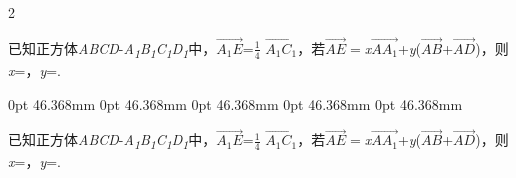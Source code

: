 \documentclass[fontset=none]{ctexart}
\begin{document}
\def\QPTEXT{已知正方体\emph{ABCD}-\emph{A\textsubscript{1}B\textsubscript{1}C\textsubscript{1}D\textsubscript{1}}中，\(\overrightarrow{A_{1}E}\)=\(\frac{1}{4}\) \(\overrightarrow{A_{1}C_{1}}\)，若\(\overrightarrow{AE} =\)\emph{x}\(\overrightarrow{AA_{1}}\)+\emph{y}(\(\overrightarrow{AB}\)+\(\overrightarrow{AD}\))，则\emph{x}\nobreak=\kongbai{}，\emph{y}\nobreak=\kongbai{}.}
\begin{multicols}{2}
\noindent\begingroup\hsize=46.368mm\raggedright \QPTEXT\par\endgroup
{}
\noindent\begingroup{} 0pt 46.368mm 0pt 46.368mm 0pt 46.368mm 0pt 46.368mm 0pt 46.368mm\raggedright \QPTEXT\par\endgroup
{}
\end{multicols}
\end{document}
